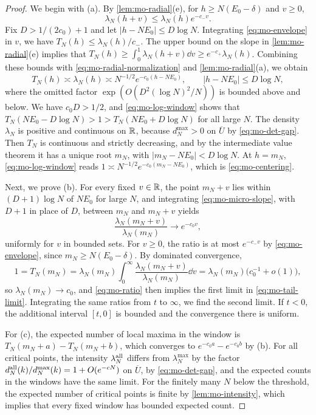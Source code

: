 \begin{proof}
We begin with (a). By \cref{lem:mo-radial}(e), for $h\ge N(E_0-\delta)$ and $v\ge0$,
\begin{equation}\label{eq:mo-envelope}
\lambda_N(h+v)\le\lambda_N(h)e^{-c_-v}.
\end{equation}
Fix $D>1/(2c_0)+1$ and let $|h-NE_0|\le D\log N$. Integrating \eqref{eq:mo-envelope} in $v$, we have $T_N(h)\le\lambda_N(h)/c_-$. The upper bound on the slope in \cref{lem:mo-radial}(e) implies that $T_N(h)\ge\int_0^1\lambda_N(h+v)\dd v\ge e^{-c_+}\lambda_N(h)$. Combining these bounds with \eqref{eq:mo-radial-normalization} and \cref{lem:mo-radial}(a), we obtain
\begin{equation}\label{eq:mo-log-window}
T_N(h)\asymp\lambda_N(h)\asymp N^{-1/2}e^{-c_0(h-NE_0)},\qquad|h-NE_0|\le D\log N,
\end{equation}
where the omitted factor $\exp(O(D^2(\log N)^2/N))$ is bounded above and below. We have $c_0D>1/2$, and \eqref{eq:mo-log-window} shows that $T_N(NE_0-D\log N)>1>T_N(NE_0+D\log N)$ for all large $N$. The density $\lambda_N$ is positive and continuous on $\mathbb R$, because $d_N^{\max}>0$ on $\overline U$ by \eqref{eq:mo-det-gap}. Then $T_N$ is continuous and strictly decreasing, and by the intermediate value theorem it has a unique root $m_N$, with $|m_N-NE_0|<D\log N$. At $h=m_N$, \eqref{eq:mo-log-window} reads $1\asymp N^{-1/2}e^{-c_0(m_N-NE_0)}$, which is \eqref{eq:mo-centering}.

Next, we prove (b). For every fixed $v\in\mathbb R$, the point $m_N+v$ lies within $(D+1)\log N$ of $NE_0$ for large $N$, and integrating \eqref{eq:mo-micro-slope}, with $D+1$ in place of $D$, between $m_N$ and $m_N+v$ yields
\begin{equation}\label{eq:mo-ratio}
\frac{\lambda_N(m_N+v)}{\lambda_N(m_N)}\longrightarrow e^{-c_0v},
\end{equation}
uniformly for $v$ in bounded sets. For $v\ge0$, the ratio is at most $e^{-c_-v}$ by \eqref{eq:mo-envelope}, since $m_N\ge N(E_0-\delta)$. By dominated convergence,
\[
1=T_N(m_N)=\lambda_N(m_N)\int_0^\infty\frac{\lambda_N(m_N+v)}{\lambda_N(m_N)}\dd v=\lambda_N(m_N)\bigl(c_0^{-1}+o(1)\bigr),
\]
so $\lambda_N(m_N)\to c_0$, and \eqref{eq:mo-ratio} then implies the first limit in \eqref{eq:mo-tail-limit}. Integrating the same ratios from $t$ to $\infty$, we find the second limit. If $t<0$, the additional interval $[t,0]$ is bounded and the convergence there is uniform.

For (c), the expected number of local maxima in the window is $T_N(m_N+a)-T_N(m_N+b)$, which converges to $e^{-c_0a}-e^{-c_0b}$ by (b). For all critical points, the intensity $\lambda_N^{\rm all}$ differs from $\lambda_N^{\max}$ by the factor $d_N^{\rm all}(k)/d_N^{\max}(k)=1+O(e^{-cN})$ on $\overline U$, by \eqref{eq:mo-det-gap}, and the expected counts in the windows have the same limit. For the finitely many $N$ below the threshold, the expected number of critical points is finite by \cref{lem:mo-intensity}, which implies that every fixed window has bounded expected count.


\end{proof}
